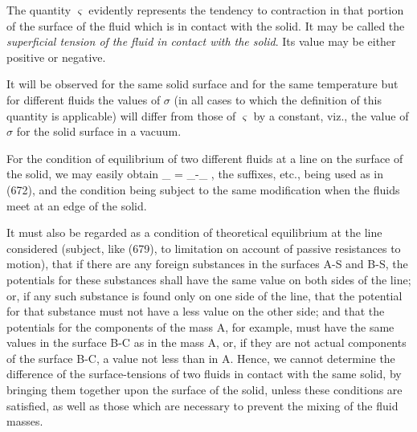\documentclass[12pt]{article}
\begin{document}
The quantity $\varsigma$ evidently represents the tendency to contraction in that portion of the surface of the fluid which is in contact with the solid. It may be called the \textit{superficial tension of the fluid in contact with the solid}. Its value may be either positive or negative.

It will be observed for the same solid surface and for the same temperature but for different fluids the values of $\sigma$ (in all cases to which the definition of this quantity is applicable) will differ from those of $\varsigma$ by a constant, viz., the value of $\sigma$ for the solid surface in a vacuum.

For the condition of equilibrium of two different fluids at a line on the surface of the solid, we may easily obtain
\eqs \sigma_{} \cos \alpha = \varsigma_{}-\varsigma_{}  ,  \label{679}\eqe
the suffixes, etc., being used as in (672), and the condition being subject to the same modification when the fluids meet at an edge of the solid.

It must also be regarded as a condition of theoretical equilibrium at the line considered (subject, like (679), to limitation on account of passive resistances to motion), that if there are any foreign substances in the surfaces A-S and B-S, the potentials for these substances shall have the same value on both sides of the line; or, if any such substance is found only on one side of the line, that the potential for that substance must not have a less value on the other side; and that the potentials for the components of the mass A, for example, must have the same values in the surface B-C as in the mass A, or, if they are not actual components of the surface B-C, a value not less than in A. Hence, we cannot determine the difference of the surface-tensions of two fluids in contact with the same solid, by bringing them together upon the surface of the solid, unless these conditions are satisfied, as well as those which are necessary to prevent the mixing of the fluid masses.
\end{document}
